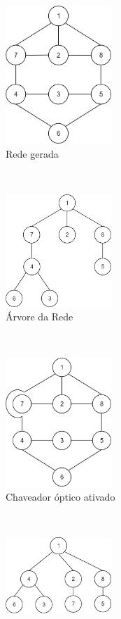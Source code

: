\begin{figure}[t!]
	\centering
	\begin{subfigure}[t]{0.4\textwidth}
		\centering
		\includegraphics[width=4cm]{./figuras/BSN-ex-network-generation.png} %
		\caption{Rede gerada}
		\label{BSN-example-network}
	\end{subfigure}%
	~
	\begin{subfigure}[t]{0.4\textwidth}
		\centering
		\includegraphics[width=4cm]{./figuras/BSN-ex-network-generation-tree.png} %
	\caption{Árvore da Rede}
	\label{BSN-example-network-tree}
	\end{subfigure}
	~
	\begin{subfigure}[t]{0.4\textwidth}
		\centering
		\includegraphics[width=4cm]{./figuras/BSN-ex-bypass.png} %
	\caption{Chaveador óptico ativado}
	\label{BSN-example-opt-switch}
	\end{subfigure}
	~
	\begin{subfigure}[t]{0.4\textwidth}
		\centering
		\includegraphics[width=4cm]{./figuras/BSN-ex-network-final.png} %

\end{subfigure}
\end{figure}
